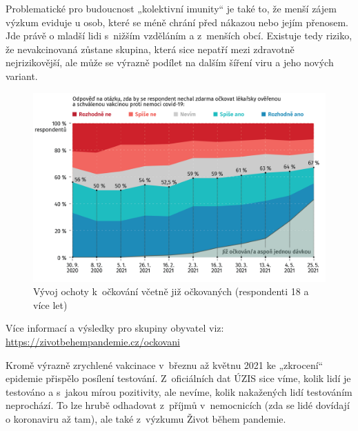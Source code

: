 Problematické pro budoucnost „kolektivní imunity“ je také to, že menší zájem výzkum eviduje u osob, které se méně chrání před nákazou nebo jejím přenosem. Jde právě o mladší lidi s nižším vzděláním a z menších obcí. Existuje tedy riziko, že nevakcinovaná zůstane skupina, která sice nepatří mezi zdravotně nejrizikovější, ale může se výrazně podílet na dalším šíření viru a jeho nových variant.

\begin{figure}[ht]
    \centering
    \includegraphics[width=\textwidth]{./pic/zbp-graf6.png}
    \caption{Vývoj ochoty k očkování včetně již očkovaných (respondenti 18 a více let)}
    \label{fig:zbp6}
\end{figure}

Více informací a výsledky pro skupiny obyvatel viz: \url{https://zivotbehempandemie.cz/ockovani}

Kromě výrazně zrychlené vakcinace v březnu až květnu 2021 ke „zkrocení“ epidemie přispělo posílení testování. Z oficiálních dat ÚZIS sice víme, kolik lidí je testováno a s jakou mírou pozitivity, ale nevíme, kolik nakažených lidí testováním neprochází. To lze hrubě odhadovat z příjmů v nemocnicích (zda se lidé dovídají o koronaviru až tam), ale také z výzkumu Život během pandemie. 


